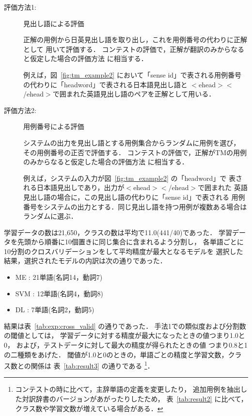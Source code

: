 \begin{description}
\item[評価方法1:] 見出し語による評価

  正解の用例から日英見出し語を取り出し，これを用例番号の代わりに正解として
  用いて評価する．
  コンテストの評価で，正解が翻訳のみからなると仮定した場合の評価方法
  に相当する．

  例えば，図~\ref{fig:tm_example2} において「sense id」で表される用例番号
  の代わりに「headword」で表される日本語見出し語と
  $<$ehead$>$$<$/ehead$>$で囲まれた英語見出し語のペアを正解として用いる．
\item[評価方法2:] 用例番号による評価

  システムの出力を見出し語とする用例集合からランダムに用例を選び，
  その用例番号の正否で評価する．
  コンテストの評価で，正解がTMの用例のみからなると仮定した場合の評価方法
  に相当する．

  例えば，システムの入力が図~\ref{fig:tm_example2} の「headword」で
  表される日本語見出しであり，出力が$<$ehead$>$$<$/ehead$>$で囲まれた
  英語見出し語の場合に，この見出し語の代わりに「sense id」で表される
  用例番号をシステムの出力とする．同じ見出し語を持つ用例が複数ある場合は
  ランダムに選ぶ．
\end{description}

学習データの数は21,650，クラスの数は平均で11.0(441/40)であった．
学習データを先頭から順番に10個置きに同じ集合に含まれるよう分割し，
各単語ごとに10分割のクロスバリデーションをして平均精度が最大となるモデルを
選択した結果，選択されたモデルの内訳は次の通りであった．

\begin{itemize}
\item ME : 21単語(名詞14，動詞7)
\item SVM : 12単語(名詞4，動詞8)
\item DL : 7単語(名詞2，動詞5)
\end{itemize}

結果は表~\ref{tab:exp:cross_valid} の通りであった．
手法1での類似度および分割数の閾値としては，
学習データに対する精度が最大になったときの値つまり1.0と0，
および，テストデータに対して最大の精度が得られたときの値
つまり0.8と1の二種類をあげた．
閾値が1.0と0のときの，単語ごとの精度と学習文数，クラス数との関係は
表~\ref{tab:result3} の通りである
\footnote{
  コンテストの時に比べて，主辞単語の定義を変更したり，
  追加用例を抽出した対訳辞書のバージョンがあがったりしたため，
  表~\ref{tab:result2} に比べて，クラス数や学習文数が増えている場合がある．
}．

